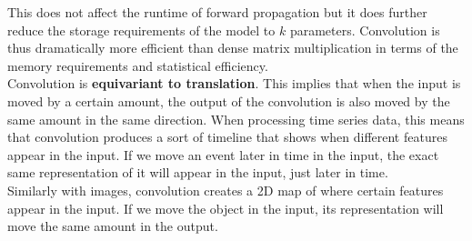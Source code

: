 \begin{multicols}{2}
	This does not affect the runtime of forward propagation but it does further reduce the storage requirements of the model to $k$ parameters.
	Convolution is thus dramatically more efficient than dense matrix multiplication in terms of the memory requirements and statistical efficiency.\\

	Convolution is \textbf{equivariant to translation}.
	This implies that when the input is moved by a certain amount, the output of the convolution is also moved by the same amount in the same direction.
	When processing time series data, this means that convolution produces a sort of timeline that shows when different features appear in the input.
	If we move an event later in time in the input, the exact same representation of it will appear in the input, just later in time.\\
	Similarly with images, convolution creates a 2D map of where certain features appear in the input. If we move the object in the input, its representation will move the same amount in the output.\\


\end{multicols}
